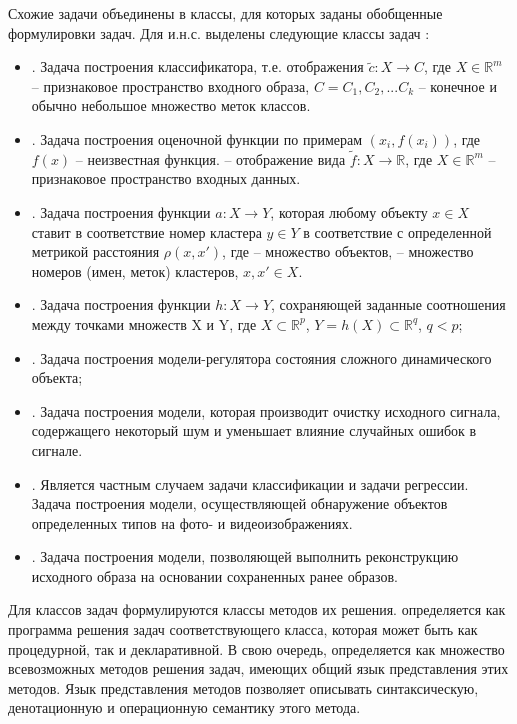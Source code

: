Схожие задачи объединены в классы, для которых заданы обобщенные формулировки задач. Для и.н.с. выделены следующие классы задач :
\begin{itemize}
	\item {}. Задача построения классификатора, т.е. отображения $\tilde c: X \rightarrow C$, где $ X \in \mathbb{R}^m$ -- признаковое пространство входного образа, $C = {C_1, C_2, ...C_k }$ -- конечное и обычно небольшое множество меток классов.
	\item {}. Задача построения оценочной функции по примерам $(x_i, f(x_i))$, где $f(x)$ -- неизвестная функция.  -- отображение вида $\tilde{f}: X \rightarrow \mathbb{R}$, где $X \in \mathbb{R}^m$ -- признаковое пространство входных данных.
	\item {}. Задача построения функции $a: X \rightarrow Y$, которая любому объекту $x \in X$ ставит в соответствие номер кластера $y \in Y$ в соответствие с определенной метрикой расстояния $\rho(x, x')$, где  -- множество объектов,  -- множество номеров (имен, меток) кластеров, $x, x' \in X$.
	\item {}. Задача построения функции $h: X \rightarrow Y$, сохраняющей заданные соотношения между точками множеств X и Y, где $X \subset \mathbb{R}^p$, $Y=h(X) \subset \mathbb{R}^q$, $q < p$;
	\item {}. Задача построения модели-регулятора состояния сложного динамического объекта;
	\item {}. Задача построения модели, которая производит очистку исходного сигнала, содержащего некоторый шум и уменьшает влияние случайных ошибок в сигнале.
	\item {}. Является частным случаем задачи классификации и задачи регрессии. Задача построения модели, осуществляющей обнаружение объектов определенных типов на фото- и видеоизображениях.
	\item {}. Задача построения модели, позволяющей выполнить реконструкцию исходного образа на основании сохраненных ранее образов.
\end{itemize}

Для классов задач формулируются классы методов их решения.  определяется как программа решения задач соответствующего класса, которая может быть как процедурной, так и декларативной. В свою очередь,  определяется как множество всевозможных методов решения задач, имеющих общий язык представления этих методов. Язык представления методов позволяет описывать синтаксическую, денотационную и операционную семантику этого метода.

